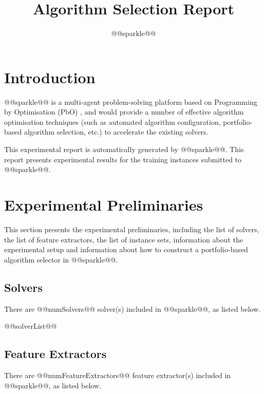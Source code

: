 \documentclass[british]{article}
\title{Algorithm Selection Report}
\author{ @@sparkle@@ }
\newif\iftest
\begin{document}
\maketitle %


\section{Introduction}
\label{sec:Introduction}

@@sparkle@@ \cite{Hoos15} is a multi-agent problem-solving platform based on Programming by Optimisation (PbO) \cite{Hoos12}, and would provide a number of effective algorithm optimisation techniques (such as automated algorithm configuration, portfolio-based algorithm selection, etc.) to accelerate the existing solvers.

This experimental report is automatically generated by @@sparkle@@. This report presents experimental results for the training instances submitted to @@sparkle@@\iftest, as well as for running the @@sparkle@@ portfolio selector to solve the test instances in the instance set @@testInstanceClass@@\fi.

\section{Experimental Preliminaries}
\label{sec:Experimental_Preliminaries}

This section presents the experimental preliminaries, including the list of solvers, the list of feature extractors, the list of instance sets, information about the experimental setup and information about how to construct a portfolio-based algorithm selector in @@sparkle@@.

\subsection{Solvers}
\label{sec:Solvers}
There are @@numSolvers@@ solver(s) included in @@sparkle@@, as listed below.

\begin{enumerate} 
@@solverList@@
\end{enumerate}

\subsection{Feature Extractors}
\label{sec:Feature_Extractors}
There are @@numFeatureExtractors@@ feature extractor(s) included in @@sparkle@@, as listed below.
\end{document}
